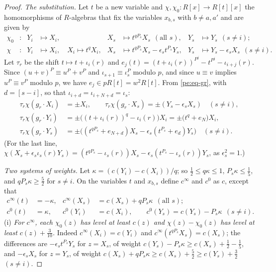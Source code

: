 \documentclass[10pt]{amsart}
\theoremstyle{definition}
\theoremstyle{remark}
\begin{document}
\begin{proof}
\emph{The substitution.} Let $t$ be a new variable and $\chi,\chi_0\colon R[x]\to R[t][x]$ the
homomorphisms of $R$-algebras that fix the variables $x_{b,s}$ with $b\ne a,a'$ and are given by
\begin{align*}
\chi_0&\colon& Y_i&\mapsto X_i,& X_s&\mapsto t^{qP_s}X_s\ \ (\text{all }s),& Y_s&\mapsto Y_s\ \
(s\ne i);\\
\chi&\colon& Y_i&\mapsto X_i,\quad X_i\mapsto t^{q}X_i,& X_s&\mapsto t^{qP_s}X_s-\epsilon_st^{P_s}
Y_s,& Y_s&\mapsto Y_s-\epsilon_sX_s\ \ (s\ne i).
\end{align*}
Let $\tau_r$ be the shift $t\mapsto t+\iota_i(r)$ and $e_j(t)=(t+\iota_i(r))^{P^j}-t^{P^j}-
\iota_{i+j}(r)$. Since $(u+v)^{P}\equiv u^P+v^P$ and $\iota_{s+1}\equiv\iota_s^P$ modulo $p$, and
since $u\equiv v$ implies $u^P\equiv v^P$ modulo $p$, we have $e_j\in pR[t]=w^2R[t]$. From
\eqref{pe:eq-gr}, with $d=[s-i]$, so that $\iota_{i+d}=\iota_{i+N+d}=\iota_s$:
\begin{equation}\label{pe:eq-key}
\begin{aligned}
\tau_r\chi(g_r\cdot X_i)&=\pm X_i,\qquad\tau_r\chi(g_r\cdot X_s)=\pm(Y_s-\epsilon_sX_s)\quad(s\ne
i),\\
\tau_r\chi(g_r\cdot Y_i)&=\pm\bigl((t+\iota_i(r))^q-\iota_i(r)\bigr)X_i=\pm\bigl(t^q+e_N\bigr)X_i,\\
\tau_r\chi(g_r\cdot Y_s)&=\pm\bigl((t^{qP_s}+e_{N+d})X_s-\epsilon_s(t^{P_s}+e_d)Y_s\bigr)\quad(s\ne
i).
\end{aligned}
\end{equation}
(For the last line, $\chi(X_s+\epsilon_s\iota_s(r)Y_s)=(t^{qP_s}-\iota_s(r))X_s-\epsilon_s(t^{P_s}-
\iota_s(r))Y_s$, as $\epsilon_s^2=1$.)

\emph{Two systems of weights.} Let $\kappa=(c(Y_i)-c(X_i))/q$; so $\tfrac12\le q\kappa\le1$,
$P_s\kappa\le\tfrac15$, and $qP_s\kappa\ge\tfrac52$ for $s\ne i$. On the variables $t$ and
$x_{b,s}$ define $c^\infty$ and $c^0$ as $c$, except that
\begin{align*}
c^\infty(t)&=-\kappa,& c^\infty(X_s)&=c(X_s)+qP_s\kappa\ \ (\text{all }s);\\
c^0(t)&=\kappa,& c^0(Y_i)&=c(X_i),\qquad c^0(Y_s)=c(Y_s)-P_s\kappa\ \ (s\ne i).
\end{align*}
(i) \emph{For $c^\infty$, each $\chi_0(z)$ has level at least $c(z)$ and $\chi(z)-\chi_0(z)$ has
level at least $c(z)+\tfrac3{10}$.} Indeed $c^\infty(X_i)=c(Y_i)$ and $c^\infty(t^{qP_s}X_s)=
c(X_s)$; the differences are $-\epsilon_st^{P_s}Y_s$ for $z=X_s$, of weight $c(Y_s)-P_s\kappa\ge
c(X_s)+\tfrac12-\tfrac15$, and $-\epsilon_sX_s$ for $z=Y_s$, of weight $c(X_s)+qP_s\kappa\ge
c(X_s)+\tfrac52\ge c(Y_s)+\tfrac32$ $(s\ne i)$.


\end{proof}
\end{document}
